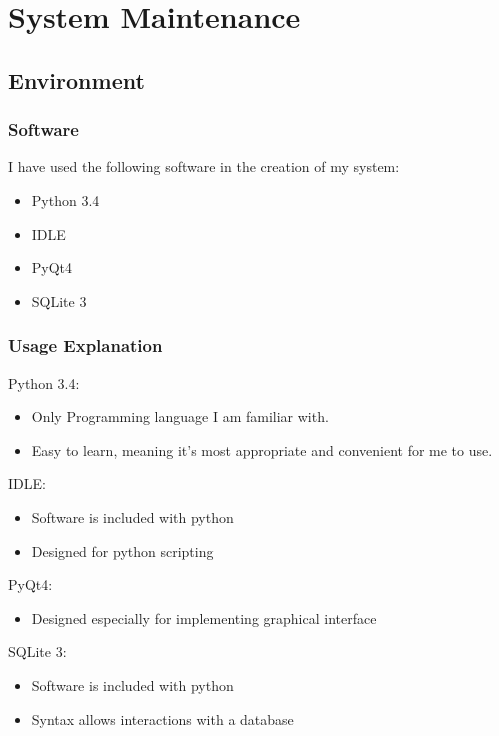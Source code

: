 \chapter{System Maintenance}

\section{Environment}

\subsection{Software}

I have used the following software in the creation of my system:

\begin{itemize}
    \item Python 3.4
    \item IDLE
    \item PyQt4
    \item SQLite 3
\end{itemize}

\subsection{Usage Explanation}



Python 3.4:
\begin{itemize}
    \item Only Programming language I am familiar with.
    \item Easy to learn, meaning it's most appropriate and convenient for me to use.
\end{itemize}


IDLE:
    \begin{itemize}
    \item Software is included with python
    \item Designed for python scripting
\end{itemize}


PyQt4:
\begin{itemize}
    \item Designed especially for implementing graphical interface
\end{itemize}

SQLite 3:
\begin{itemize}
    \item Software is included with python
    \item Syntax allows interactions with a database
\end{itemize}




